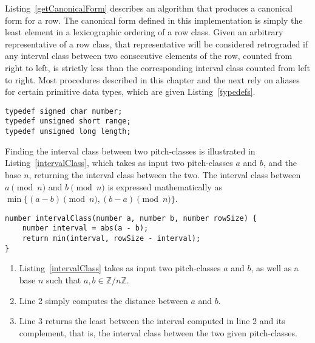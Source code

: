 Listing~\ref{getCanonicalForm} describes an algorithm that produces a canonical form for a row. The canonical form defined in this implementation is simply the least element in a lexicographic ordering of a row class. Given an arbitrary representative of a row class, that representative will be considered retrograded if any interval class between two consecutive elements of the row, counted from right to left, is strictly less than the corresponding interval class counted from left to right. Most procedures described in this chapter and the next rely on aliases for certain primitive data types, which are given Listing~\ref{typedefs}.

\begin{lstlisting}[caption={Defining aliases for common primitive data types.},label={typedefs}]
typedef signed char number;
typedef unsigned short range;
typedef unsigned long length;
\end{lstlisting}


Finding the interval class between two pitch-classes is illustrated in Listing~\ref{intervalClass}, which takes as input two pitch-classes $a$ and $b$, and the base $n$, returning the interval class between the two. The interval class between $a \pmod n$ and $b \pmod n$ is expressed mathematically as $\min\{(a - b) \pmod n, (b - a) \pmod n\}$.

\begin{lstlisting}[caption={Computing the interval class between two pitch-classes.},label={intervalClass}]
number intervalClass(number a, number b, number rowSize) {
    number interval = abs(a - b);
    return min(interval, rowSize - interval);
}
\end{lstlisting}

\begin{enumerate}
\item Listing~\ref{intervalClass} takes as input two pitch-classes $a$ and $b$, as well as a base $n$ such that $a, b \in \mathbb{Z} / n \mathbb{Z}$.
\item Line 2 simply computes the distance between $a$ and $b$.
\item Line 3 returns the least between the interval computed in line 2 and its complement, that is, the interval class between the two given pitch-classes.
\end{enumerate}

